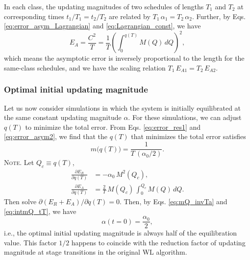 \documentclass[reprint, floatfix]{revtex4-1}
\newcommand{\note}[1]{{\color{DarkGreen}\footnotesize \textsc{Note.} #1}}
\begin{document}
In each class, the updating magnitudes of two schedules
of lengths $T_1$ and $T_2$
at corresponding times $t_1/T_1 = t_2/T_2$
are related by $T_1 \, \alpha_1 = T_2 \, \alpha_2$.
%
Further, by Eqs.
\eqref{eq:error_asym_Lagrangian}
and
\eqref{eq:Lagrangian_const},
we have
%
\begin{equation}
  E_A
  =
  \frac { C^2 } { T }
  =
  \frac 1 T
  \left(
    \int_0^{ q(T) } M(Q) \, dQ
  \right)^2
  ,
\label{eq:error_asym2}
\end{equation}
%
which means the asymptotic error
is inversely proportional to the length
for the same-class schedules,
and we have the scaling relation
$T_1 \, E_{A1} = T_2 \, E_{A2}$.





\subsubsection{\label{sec:optinitalpha}
  Optimal initial updating magnitude
}


Let us now consider simulations in which
the system is initially equilibrated at the same
constant updating magnitude $\alpha$.
%
For these simulations,
we can adjust $q(T)$
to minimize the total error.
%
From Eqs. \eqref{eq:error_res1}
and \eqref{eq:error_asym2},
we find that
the $q(T)$ that minimizes
the total error satisfies
\begin{equation}
  m\bigl( q(T) \bigr)
  =
  \frac{1} { T \, (\alpha_0 / 2) }
  .
\label{eq:opt_qT}
\end{equation}
%
\note{Let $Q_c \equiv q(T)$,
$$
\begin{aligned}
  \frac{
    \partial E_R
  }
  {
    \partial q(T)
  }
  &=
  -\alpha_0 \, M^2(Q_c)
  ,
  \\
  \frac{
    \partial E_A
  }
  {
    \partial q(T)
  }
  &=
  \frac 2 T \,
  M(Q_c) \,
  \int_0^{ Q_c } M(Q) \, dQ
  .
\end{aligned}
$$
Then solve $\partial (E_R + E_A) / \partial q(T) = 0$.
}
%
Then, by Eqs. \eqref{eq:mQ_invTa} and \eqref{eq:intmQ_tT},
we have
\begin{equation}
  \alpha( t = 0 )
  =
  \frac{ \alpha_0 }
       { 2 }
  ,
\label{eq:half_alpha0}
\end{equation}
%
i.e., the optimal initial updating magnitude
is always half of the equilibration value.
%
This factor $1/2$
happens to coincide with the
reduction factor of updating magnitude
at stage transitions
in the original WL algorithm\cite{
wang2001, wang2001pre}.
\end{document}
